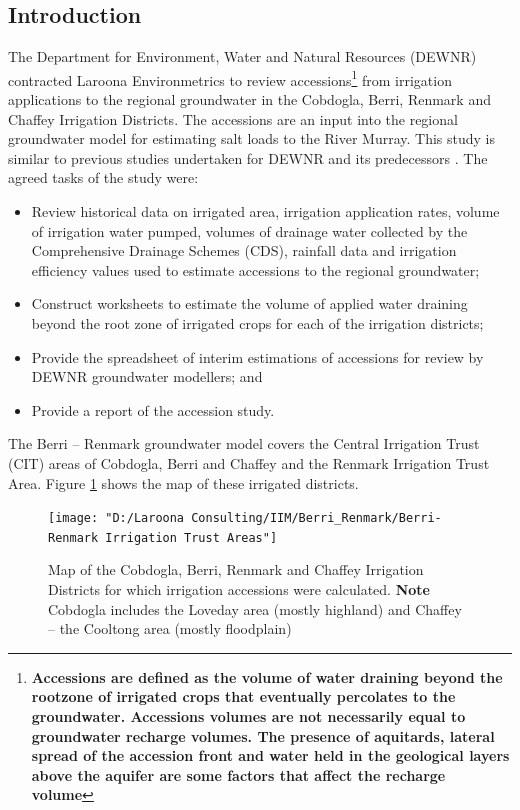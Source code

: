 \documentclass[a4paper, titlepage, 12pt]{article}\usepackage[]{graphicx}\usepackage[]{color}
\begin{document}
\begin{sffamily}
\section{Introduction}
The Department for Environment, Water and Natural Resources (DEWNR) contracted Laroona Environmetrics to review accessions\footnote{\footnotesize{\bfseries{Accessions} are defined as the volume of water draining beyond the rootzone of irrigated crops that eventually percolates to the groundwater. Accessions volumes are not necessarily equal to groundwater recharge volumes. The presence of aquitards, lateral spread of the accession front and water held in the geological layers above the aquifer are some factors that affect the recharge volume}} from irrigation applications to the regional groundwater in the Cobdogla, Berri, Renmark and Chaffey Irrigation Districts. The accessions are an input into the regional groundwater model for estimating salt loads to the River Murray. This study is similar to previous  studies undertaken for DEWNR and its predecessors \citep{Meissner2014, Meissner2012, Meissner2011a, Meissner2011b}. The agreed tasks of the study were:

\begin{itemize}
  \item Review historical data on irrigated area, irrigation application rates, volume of irrigation water pumped, volumes of drainage water collected by the Comprehensive Drainage Schemes (CDS), rainfall data and irrigation efficiency values used to estimate accessions to the regional groundwater;
  \item  Construct worksheets to estimate the volume of applied water draining beyond the root zone of irrigated crops for each of the irrigation districts;
  \item Provide the spreadsheet of interim estimations of accessions for review by DEWNR groundwater modellers; and
  \item Provide a report of the accession study.
\end{itemize}

The Berri -- Renmark groundwater model covers the Central Irrigation Trust (CIT) areas of Cobdogla,  Berri and Chaffey and the Renmark Irrigation Trust Area.  Figure \ref{fig01} shows the map of these irrigated districts.

\begin{figure}
\texttt{[image: "D:/Laroona Consulting/IIM/Berri\_Renmark/Berri-Renmark Irrigation Trust Areas"]}
\label{fig01}
\caption{Map of the Cobdogla, Berri, Renmark and Chaffey Irrigation Districts for which irrigation accessions were calculated. \textbf{Note} Cobdogla includes the Loveday area (mostly highland) and Chaffey -- the Cooltong area (mostly floodplain)}
\end{figure}


\end{sffamily}
\end{document}
